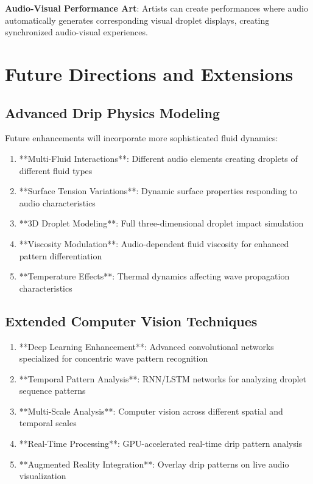 \documentclass[12pt,a4paper]{article}
\begin{document}
\textbf{Audio-Visual Performance Art}: Artists can create performances where audio automatically generates corresponding visual droplet displays, creating synchronized audio-visual experiences.

\section{Future Directions and Extensions}

\subsection{Advanced Drip Physics Modeling}

Future enhancements will incorporate more sophisticated fluid dynamics:

\begin{enumerate}
\item **Multi-Fluid Interactions**: Different audio elements creating droplets of different fluid types
\item **Surface Tension Variations**: Dynamic surface properties responding to audio characteristics
\item **3D Droplet Modeling**: Full three-dimensional droplet impact simulation
\item **Viscosity Modulation**: Audio-dependent fluid viscosity for enhanced pattern differentiation
\item **Temperature Effects**: Thermal dynamics affecting wave propagation characteristics
\end{enumerate}

\subsection{Extended Computer Vision Techniques}

\begin{enumerate}
\item **Deep Learning Enhancement**: Advanced convolutional networks specialized for concentric wave pattern recognition
\item **Temporal Pattern Analysis**: RNN/LSTM networks for analyzing droplet sequence patterns
\item **Multi-Scale Analysis**: Computer vision across different spatial and temporal scales
\item **Real-Time Processing**: GPU-accelerated real-time drip pattern analysis
\item **Augmented Reality Integration**: Overlay drip patterns on live audio visualization
\end{enumerate}
\end{document}
